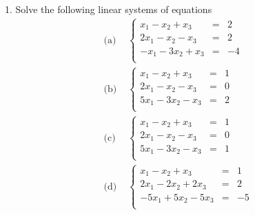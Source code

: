 \documentclass[11pt]{article}
\begin{document}
1. Solve the following linear systems of equations
$$\begin{aligned}
\text{(a)  }&  \left\{\begin{array}{rcl}
x_1 - x_2 + x_3 &=&2 \\
2x_1 - x_2 - x_3 &=& 2 \\
-x_1 - 3x_2 + x_3 &=& -4 \\
\end{array}\right.\\
\text{(b)  }&  \left\{\begin{array}{rcl}
x_1 - x_2 + x_3 &=&1 \\
2x_1 - x_2 - x_3 &=& 0 \\
5x_1 - 3x_2 - x_3 &=& 2 \\
\end{array}\right.\\
\text{(c)  }&  \left\{\begin{array}{rcl}
x_1 - x_2 + x_3 &=&1 \\
2x_1 - x_2 - x_3 &=& 0 \\
5x_1 - 3x_2 - x_3 &=& 1 \\
\end{array}\right.\\
\text{(d)  }&  \left\{\begin{array}{rcl}
x_1 - x_2 + x_3 &=&1 \\
2x_1 - 2x_2 +2 x_3 &=& 2 \\
-5x_1 + 5x_2 - 5x_3 &=&-5 \\
\end{array}\right.\\
\end{aligned}$$
\end{document}
